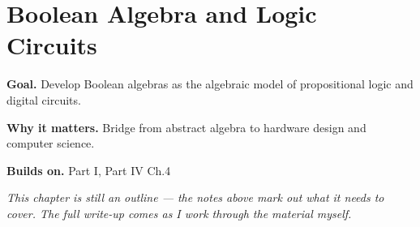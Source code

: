 \chapter{Boolean Algebra and Logic Circuits}
\label{ch:04-abstract-algebra-07}

\begin{chapterintro}
\textbf{Goal.} Develop Boolean algebras as the algebraic model of propositional logic and digital circuits.

\textbf{Why it matters.} Bridge from abstract algebra to hardware design and computer science.

\textbf{Builds on.} Part I, Part IV Ch.4
\end{chapterintro}

\textit{This chapter is still an outline --- the notes above mark out what it needs to cover. The full write-up comes as I work through the material myself.}
